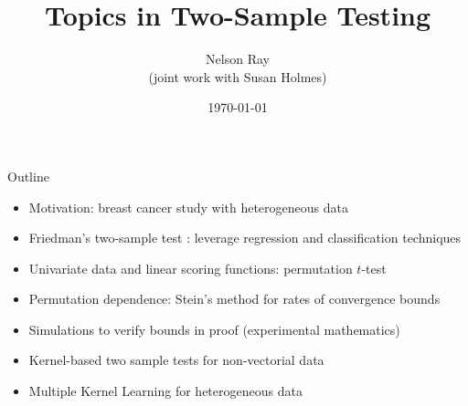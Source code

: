 \documentclass{beamer}
\begin{document}
\title[Topics in Two-Sample Testing]{Topics in Two-Sample Testing}
\author[N. Ray with S. Holmes]{Nelson Ray \\
  (joint work with Susan Holmes)}
\date{\today}

\begin{frame}
  \titlepage
\end{frame}


\begin{frame}{Outline}
  \begin{itemize}
  \item Motivation: breast cancer study with heterogeneous data \pause
  \item Friedman's two-sample test \cite{friedman30908multivariate}:
    leverage regression and classification techniques \pause
  \item Univariate data and linear scoring functions: permutation
    $t$-test \pause
  \item Permutation dependence: Stein's method for rates of
    convergence bounds \pause
  \item Simulations to verify bounds in proof (experimental
    mathematics) \pause
  \item Kernel-based two sample tests for non-vectorial data \pause
  \item Multiple Kernel Learning for heterogeneous data
  \end{itemize}
\end{frame}
\end{document}
